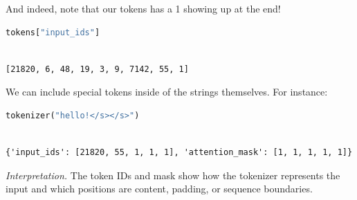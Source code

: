\documentclass[../labs.tex]{subfiles}
\begin{document}


\noindent And indeed, note that our tokens has a 1 showing up at the end!

\begin{lstlisting}[language=Python,basicstyle=\ttfamily\scriptsize,breaklines=true,breakatwhitespace=false,columns=fullflexible,keepspaces=true,numbers=none]
tokens["input_ids"]
\end{lstlisting}

\hypertarget{res:lab02-text-01-t5-ipynb-16-d657c3d13c30}{}

\begin{lstlisting}[basicstyle=\ttfamily\scriptsize,breaklines=true,breakatwhitespace=false,columns=fullflexible,keepspaces=true]

[21820, 6, 48, 19, 3, 9, 7142, 55, 1]

\end{lstlisting}



\noindent We can include special tokens inside of the strings themselves. For instance:

\begin{lstlisting}[language=Python,basicstyle=\ttfamily\scriptsize,breaklines=true,breakatwhitespace=false,columns=fullflexible,keepspaces=true,numbers=none]
tokenizer("hello!</s></s>")
\end{lstlisting}

\hypertarget{res:lab02-text-01-t5-ipynb-18-3ffc82e1d4c5}{}

\begin{lstlisting}[basicstyle=\ttfamily\scriptsize,breaklines=true,breakatwhitespace=false,columns=fullflexible,keepspaces=true]

{'input_ids': [21820, 55, 1, 1, 1], 'attention_mask': [1, 1, 1, 1, 1]}

\end{lstlisting}

\noindent\emph{Interpretation.} The token IDs and mask show how the tokenizer represents the input and which positions are content, padding, or sequence boundaries.

\end{document}
